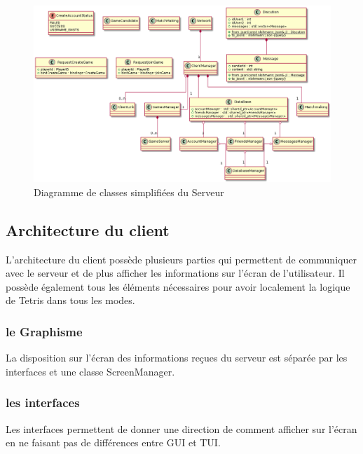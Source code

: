 \documentclass{article}
\begin{document}
\begin{figure}[H]
	\centering
	 \includegraphics[scale=0.2]{../res/uml/class/ServerStructureClass.png}
	 \caption{Diagramme de classes  simplifiées du Serveur}
	 \label{fig:WholeServerDiagram}
\end{figure}

\subsection{Architecture du client}

L'architecture du client possède plusieurs parties qui permettent de communiquer avec le serveur et de plus afficher les informations sur l'écran de l'utilisateur. Il possède également tous les éléments nécessaires pour avoir localement la logique de Tetris dans tous les modes.

\subsubsection{le Graphisme}

La disposition sur l'écran des informations reçues du serveur est séparée par les interfaces et une classe ScreenManager.

\subsubsection*{les interfaces}

Les interfaces permettent de donner une direction de comment afficher sur l'écran en ne faisant pas de différences entre GUI et TUI.
\end{document}
